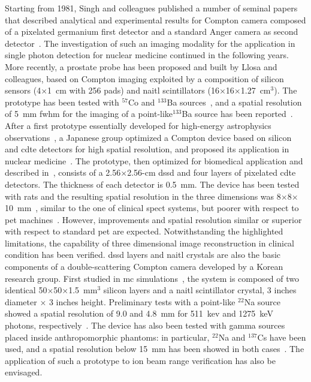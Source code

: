 Starting from 1981, Singh and colleagues published a number of seminal papers that described analytical and experimental results for Compton camera composed of a pixelated germanium first detector and a standard Anger camera as second detector~\parencite{Singh1981, Singh1983, Singh1983b}. The investigation of such an imaging modality for the application in single photon detection for nuclear medicine continued in the following years. More recently, a prostate probe has been proposed and built by Llosa and colleagues, based on Compton imaging exploited by a composition of silicon sensors (4$\times$1~cm with 256 pads) and \gls{naitl} scintillators (16$\times$16$\times$1.27~cm$^3$). The prototype has been tested with $^{57}$Co and $^{133}$Ba sources~\parencite{Llosa2006}, and a spatial resolution of 5~mm \gls{fwhm} for the imaging of a point-like$^{133}$Ba source has been reported~\parencite{Llosa2008}. After a first prototype essentially developed for high-energy astrophysics observations~\parencite{Takeda2007}, a Japanese group optimized a Compton device based on silicon and \gls{cdte} detectors for high spatial resolution, and proposed its application in nuclear medicine~\parencite{Takeda2009}. The prototype, then optimized for biomedical application and described in~\cite{Takeda2012}, consists of a 2.56$\times$2.56-cm \gls{dssd} and four layers of pixelated \gls{cdte} detectors. The thickness of each detector is 0.5~mm. The device has been tested with rats and the resulting spatial resolution in the three dimensions was 8$\times$8$\times$10~mm~\parencite{Suzuki2013}, similar to the one of clinical \gls{spect} systems, but poorer with respect to \gls{pet} machines~\parencite{Madsen2007}. However, improvements and spatial resolution similar or superior with respect to standard \gls{pet} are expected. Notwithstanding the highlighted limitations, the capability of three dimensional image reconstruction in clinical condition has been verified.
\gls{dssd} layers and \gls{naitl} crystals are also the basic components of a double-scattering Compton camera developed by a Korean research group. First studied in \gls{mc} simulations~\parencite{Seo2007}, the system is composed of two identical 50$\times$50$\times$1.5~mm$^3$ silicon layers and a \gls{naitl} scintillator crystal, 3 inches diameter $\times$ 3 inches height. Preliminary tests with a point-like $^{22}$Na source showed a spatial resolution of 9.0 and 4.8~mm for 511~kev and 1275~keV photons, respectively~\parencite{Seo2010}. The device has also been tested with gamma sources placed inside anthropomorphic phantoms: in particular, $^{22}$Na and $^{137}$Cs have been used, and a spatial resolution below 15~mm has been showed in both cases~\parencite{Seo2011}. The application of such a prototype to ion beam range verification has also be envisaged. 
